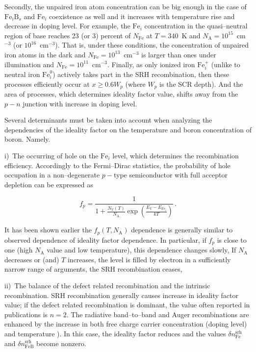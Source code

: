Secondly, the unpaired iron atom concentration can be big enough in the case of $\mathrm{Fe}_i\mathrm{B}_s$ and $\mathrm{Fe}_i$ coexistence as well
and it increases with temperature rise and decrease in doping level.
For example, the $\mathrm{Fe}_i$ concentration in the quasi--neutral region of base
reaches 23 (or 3) percent of $N_\mathrm{Fe}$ at $T=340$~K and $N_\mathrm{A}=10^{15}$~cm$^{-3}$ (or $10^{16}$~cm$^{-3}$).
That is, under these conditions, the concentration of unpaired iron atoms in the dark and $N_\mathrm{Fe}=10^{13}$~cm$^{-3}$ is larger
than ones under illumination and $N_\mathrm{Fe}=10^{11}$~cm$^{-3}$.
Finally,
as only ionized iron $\mathrm{Fe}_i^+$ (unlike to neutral iron $\mathrm{Fe}_i^0$) actively takes  part in the SRH recombination,
then these processes efficiently occur at $x\geq0.6W_p$ (where $W_p$ is the SCR depth).
And the area of processes, which determines ideality factor value,
shifts away from the $p-n$ junction with increase in doping level.

Several determinants must be taken into account when analyzing the dependencies of the ideality factor on the temperature and boron concentration of boron.
Namely.

i)~The occurring of hole on the $\mathrm{Fe}_i$ level, which determines the recombination efficiency.
Accordingly to the Fermi--Dirac statistics,
the probability of hole occupation in  a non--degenerate $p-$type semiconductor with full acceptor depletion
can be expressed as

\begin{equation}
\label{eqfp}
 f_p=\frac{1}{1+\frac{N_V(T)}{N_\mathrm{A}}\exp\left(\frac{E_V-E_{\mathrm{Fe}_i}}{kT}\right)}\,.
\end{equation}

It has been shown earlier \cite{Olikh2018SM}  the $f_p(T,N_\mathrm{A})$ dependence is generally similar to observed dependence of ideality factor dependence.
In particular, if $f_p$ is close to one (high $N_\mathrm{A}$ value and low temperature), this dependence changes slowly,
If $N_\mathrm{A}$ decreases or (and) $T$ increases,
the level is filled by electron in a sufficiently narrow range of arguments,
the SRH recombination ceases,


ii)~The balance of the defect related recombination and the intrinsic recombination.
SRH recombination generally causes increase in ideality factor value;
if the defect related recombination is dominant, the value often reported in publications is $n=2$.
The radiative band--to--band and Auger recombinations are enhanced by the increase in both free charge carrier concentration
(doping level) and temperature   \cite{Si_BtB,Si_Auger}).
In this case, the ideality factor reduces and the values $\delta n_\mathrm{Fe}^\mathrm{srh}$
and $\delta n_\mathrm{FeB}^\mathrm{srh}$ become nonzero.









